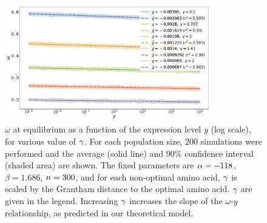 \documentclass{article}
\begin{document}
\begin{figure}[H]
    \centering
    \includegraphics[width=0.8\textwidth] {SimuStab-Grantham-Gamma-Elasticity-ExpressionLevel.pdf}
    \caption[Effect of $\DeltaDeltaG$ on the susceptibility with regards to expression level]{
    $\omega$ at equilibrium as a function of the expression level $y$ (log scale), for various value of $\DeltaDeltaG$.
    For each population size, $200$ simulations were performed and the average (solid line) and $90\%$ confidence interval (shaded area) are shown.
    The fixed parameters are $\alpha=-118$, $\beta=1.686$, $n=300$, and for each non-optimal amino acid, $\DeltaDeltaG$ is scaled by the Grantham distance to the optimal amino acid. $\DeltaDeltaG$ are given in the legend.
    Increasing $\DeltaDeltaG$ increases the slope of the $\omega$-$y$ relationship, as predicted in our theoretical model.
    }
\end{figure}
\end{document}
